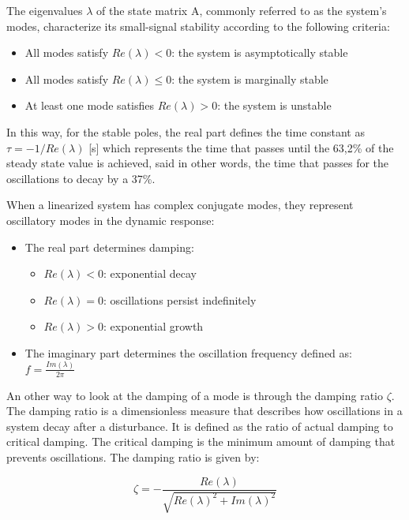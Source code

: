 The eigenvalues $\lambda$ of the state matrix A, commonly referred to as the system's modes, characterize its small-signal stability according to the following criteria:

\begin{itemize}
  \item All modes satisfy $Re(\lambda) < 0$: the system is asymptotically stable
  \item All modes satisfy $Re(\lambda) \leq 0$: the system is marginally stable
  \item At least one mode satisfies $Re(\lambda) > 0$: the system is unstable
\end{itemize}

In this way, for the stable poles, the real part defines the time constant as $\tau = -1/ Re(\lambda) $ [s] which represents the time that passes until
the 63,2\% of the steady state value is achieved, said in other words, the time that passes for the oscillations to decay by a 37\%.

When a linearized system has complex conjugate modes, they represent oscillatory modes in the dynamic response:

\begin{itemize}
  \item The real part determines damping:
  \begin{itemize}
    \item $Re(\lambda) < 0$: exponential decay
    \item $Re(\lambda) = 0$: oscillations persist indefinitely
    \item $Re(\lambda) > 0$: exponential growth
  \end{itemize}
  \item The imaginary part determines the oscillation frequency defined as: $f = \frac{Im(\lambda)}{2\pi}$
\end{itemize}

An other way to look at the damping of a mode is through the damping ratio $\zeta$. The damping ratio is a dimensionless measure that describes how oscillations 
in a system decay after a disturbance. It is defined as the ratio of actual damping to critical damping. The critical damping is the minimum amount of damping that prevents oscillations. 
The damping ratio is given by: 

\begin{equation}
  \zeta = -  \frac{Re(\lambda)}{\sqrt{Re(\lambda)^2+Im(\lambda)^2}}
\end{equation}

